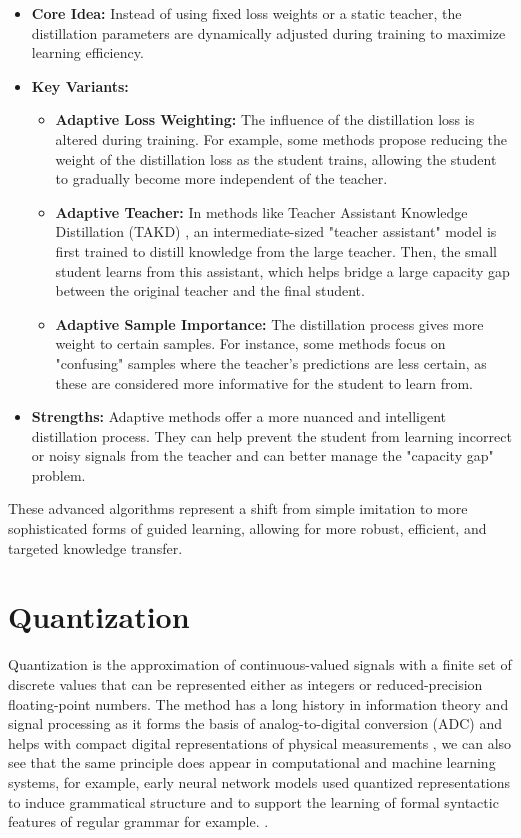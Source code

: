 \begin{itemize}
    \item \textbf{Core Idea:} Instead of using fixed loss weights or a static teacher, the distillation parameters are dynamically adjusted during training to maximize learning efficiency.
    \item \textbf{Key Variants:}
        \begin{itemize}
            \item \textbf{Adaptive Loss Weighting:} The influence of the distillation loss is altered during training. For example, some methods \cite{Cho2019} propose reducing the weight of the distillation loss as the student trains, allowing the student to gradually become more independent of the teacher.
            \item \textbf{Adaptive Teacher:} In methods like Teacher Assistant Knowledge Distillation (TAKD) \cite{Mirzadeh2020}, an intermediate-sized "teacher assistant" model is first trained to distill knowledge from the large teacher. Then, the small student learns from this assistant, which helps bridge a large capacity gap between the original teacher and the final student.
            \item \textbf{Adaptive Sample Importance:} The distillation process gives more weight to certain samples. For instance, some methods focus on "confusing" samples where the teacher's predictions are less certain, as these are considered more informative for the student to learn from.
        \end{itemize}
    \item \textbf{Strengths:} Adaptive methods offer a more nuanced and intelligent distillation process. They can help prevent the student from learning incorrect or noisy signals from the teacher and can better manage the "capacity gap" problem.
\end{itemize}

These advanced algorithms represent a shift from simple imitation to more sophisticated forms of guided learning, allowing for more robust, efficient, and targeted knowledge transfer.




\section{Quantization}


Quantization is the approximation of continuous-valued signals with a finite set of discrete values that can be represented either as integers or reduced-precision floating-point numbers. The method has a long history in information theory and signal processing \cite{gray1998quantization} as it forms the basis of analog-to-digital conversion (ADC) and helps with compact digital representations of physical measurements \cite{pelgrom2010adc}, we can also see that the same principle does appear in computational and machine learning systems, for example, early neural network models used quantized representations to induce grammatical structure and to support the learning of formal syntactic features of regular grammar for example. \cite{giles-miller-gi-1991}.

